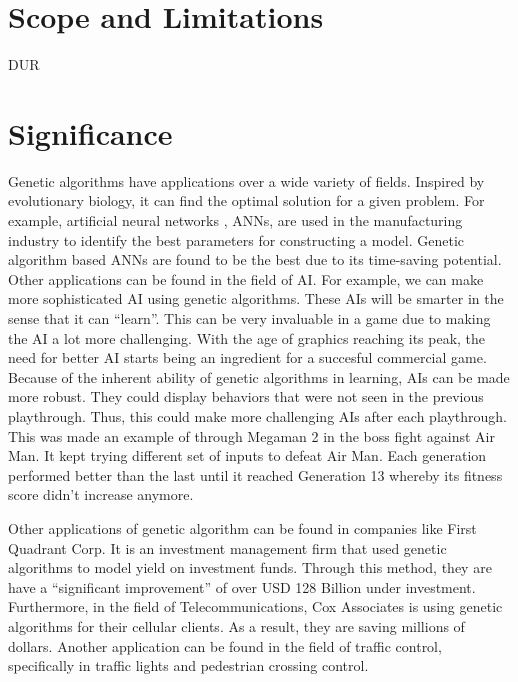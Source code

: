 \section{Scope and Limitations}

DUR

\section{Significance}

Genetic algorithms have applications over a wide variety of fields.
Inspired by evolutionary biology, it can find the optimal solution
for a given problem.  For example, artificial neural networks , ANNs, are used in the manufacturing
industry to identify the best parameters for constructing a model.  Genetic 
algorithm based ANNs are found to be the best due to its time-saving potential\cite{Venkatesan08}.  
Other applications can be found in the field of AI.  For example, we can 
make more sophisticated AI using genetic algorithms.  These AIs will be smarter in the 
sense that it can ``learn''.  This can be very invaluable in a game due to making the AI a lot more challenging.  
With the age of graphics reaching its peak, the need for better AI starts being an
ingredient for a succesful commercial game\cite{Yue06}.  Because of the inherent ability
of genetic algorithms in learning, AIs can be made more robust.  They could 
display behaviors that were not seen in the previous playthrough.  Thus, 
this could make more challenging AIs after each playthrough.  This was made an 
example of through Megaman 2 in the boss fight against Air Man.  It kept trying different 
set of inputs to defeat Air Man.  Each generation performed better than the last 
until it reached Generation 13 whereby its fitness score didn't increase anymore\cite{website:Kuliniewicz09}.  


Other applications of genetic algorithm can be found in companies like First Quadrant Corp.
It is an investment management firm that used genetic algorithms to model yield on 
investment funds\cite{website:Davis}.  Through this method, they are have a ``significant improvement''
of over USD 128 Billion under investment\cite{website:Davis}.  Furthermore, in the field of Telecommunications, 
Cox Associates is using genetic algorithms for their cellular clients\cite{website:Davis}.  
As a result, they are saving millions of dollars.  Another application can be found 
in the field of traffic control, specifically in traffic lights and pedestrian crossing
control\cite{Turky09}.  

